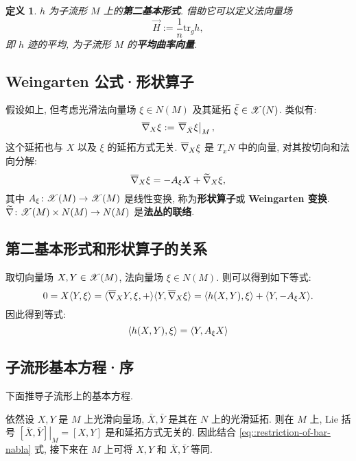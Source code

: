 \documentclass{ctexart}
\newtheorem{definition}[theorem]{定义}
\begin{document}
\begin{definition}
	$h$ 为子流形 $M$ 上的{\bf 第二基本形式}. 借助它可以定义法向量场
	\begin{equation}\label{eq::mean-curvature-vector-def}
		\overrightarrow{H} := \dfrac{1}{n}\mathrm{tr}_{g}h,
	\end{equation}
	即 $h$ 迹的平均, 为子流形 $M$ 的{\bf 平均曲率向量}.
\end{definition}

\subsection{Weingarten 公式·形状算子}
假设如上, 但考虑光滑法向量场 $\xi \in N(M)$ 及其延拓 $\bar{\xi} \in \mathscr{X}(N)$. 类似有:
\begin{equation*}
	\overline{\nabla}_{X}{\xi} := \left.\overline{\nabla}_{\bar{X}}{\xi}\right|_{M},
\end{equation*}
这个延拓也与 $X$ 以及 $\xi$ 的延拓方式无关. $\overline{\nabla}_{X}{\xi}$ 是 $T_xN$ 中的向量, 对其按切向和法向分解:
\begin{equation}\label{eq::Weingarten-formula}
	\overline{\nabla}_{X}{\xi} = -A_{\xi}X + \widetilde{\nabla}_{X}{\xi},
\end{equation}
其中 $A_{\xi} \colon \mathscr{X}(M) \rightarrow \mathscr{X}(M)$ 是线性变换, 称为{\bf 形状算子}或 {\bf Weingarten 变换}. $\widetilde{\nabla} \colon \mathscr{X}(M) \times N(M) \rightarrow N(M)$ 是{\bf 法丛的联络}.

\subsection{第二基本形式和形状算子的关系}
取切向量场 $X, Y \in \mathscr{X}(M)$, 法向量场 $\xi \in N(M)$. 则可以得到如下等式:
\begin{equation*}
	0 = X\langle {Y}, {\xi} \rangle = \langle {\overline{\nabla}_{X}{Y}, \xi}, {+} \rangle \langle {Y}, {\overline{\nabla}_{X}{\xi}} \rangle = \langle {h(X, Y)}, {\xi} \rangle + \langle {Y}, {-A_{\xi}X} \rangle.
\end{equation*}
因此得到等式:
\begin{equation}
	\langle {h(X, Y)}, {\xi} \rangle = \langle {Y}, {A_{\xi}{X}} \rangle
\end{equation}

\subsection{子流形基本方程·序}
下面推导子流形上的基本方程.

依然设 $X, Y$ 是 $M$ 上光滑向量场, $\bar{X}, \bar{Y}$ 是其在 $N$ 上的光滑延拓. 则在 $M$ 上, Lie 括号 $\left.[\bar{X}, \bar{Y}]\right|_{M} = [X, Y]$ 是和延拓方式无关的. 因此结合 \ref{eq::restriction-of-bar-nabla} 式, 接下来在 $M$ 上可将 $X, Y$ 和 $\bar{X}, \bar{Y}$ 等同.
\end{document}
